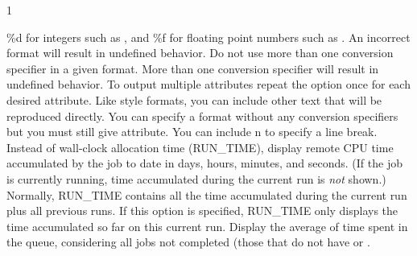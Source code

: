\begin{ManPage}{\label{man-condor-q}}{1}
\begin{Options}
{    \%d for integers such as ,
    and \%f for floating point numbers such as
    .  An incorrect format
    will result in undefined behavior.
    Do not use more than one conversion specifier in a given
    format.  More than one conversion specifier will result
    in undefined behavior.  To output multiple attributes
    repeat the  option once for each desired
    attribute.
    Like {} style formats, you can include other
    text that will be reproduced directly.   You can specify
    a format without any conversion specifiers but you must
    still give attribute.
    You can include \Bs n to specify a line break. }
   {Instead of wall-clock allocation time (RUN\_TIME), 
    display remote CPU time accumulated by the job to date in days,
    hours, minutes, and seconds.  (If the job is currently running, time
    accumulated during the current run is \emph{not} shown.)}
   {Normally, RUN\_TIME contains all the time
    accumulated during the current run plus all previous runs.  If this
    option is specified, RUN\_TIME only displays the time accumulated so
    far on this current run.}
   {Display the average of time spent in the
    queue, considering all jobs not completed (those that do not have
     or .  }
\end{Options}
\end{ManPage}

